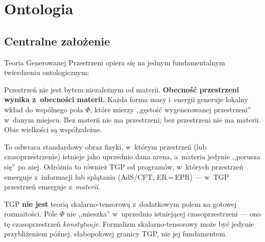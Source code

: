 \section{Ontologia}\label{sec:ontologia}

\subsection{Centralne za\l{}o\.zenie}

Teoria Generowanej Przestrzeni opiera si\k{e} na jednym fundamentalnym
twierdzeniu ontologicznym:

\begin{axiom}\label{ax:przestrzen}
Przestrze\'n nie jest bytem niezale\.znym od materii.
\textbf{Obecno\'s\'c przestrzeni wynika z~obecno\'sci materii.}
Ka\.zda forma masy i~energii generuje lokalny wk\l{}ad do wsp\'olnego
pola $\Phi$, kt\'ore mierzy ,,g\k{e}sto\'s\'c wygenerowanej przestrzeni''
w~danym miejscu. Bez materii nie ma przestrzeni; bez przestrzeni
nie ma materii. Obie wielko\'sci s\k{a} wsp\'o\l{}zale\.zne.
\end{axiom}

To odwraca standardowy obraz fizyki, w~kt\'orym przestrze\'n (lub
czasoprzestrzenie) istnieje jako uprzednio dana arena, a~materia
jedynie ,,porusza si\k{e}'' po niej. Odr\'o\.znia to r\'ownie\.z TGP od
program\'ow, w~kt\'orych przestrze\'n emerguje z~informacji lub spl\k{a}tania
(AdS/CFT, ER\,=\,EPR) --- w~TGP przestrze\'n emerguje z~\emph{materii}.

\begin{remark}
TGP \textbf{nie jest} teori\k{a} skalarno-tensorow\k{a} z~dodatkowym
polem na gotowej rozmaito\'sci. Pole $\Phi$ nie ,,mieszka'' w~uprzednio
istniej\k{a}cej czasoprzestrzeni --- ono t\k{e} czasoprzestrze\'n
\emph{konstytuuje}. Formalizm skalarno-tensorowy mo\.ze by\'c jedynie
przybli\.zeniem p\'o\'znej, s\l{}abopolowej granicy TGP, nie jej fundamentem.
\end{remark}

